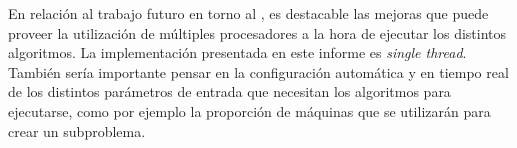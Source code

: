 \documentclass[../informe2.tex]{subfiles}
\begin{document}
\noindent En relación al trabajo futuro en torno al \mrp, es destacable las mejoras que puede proveer la utilización de múltiples procesadores a la hora de ejecutar los distintos algoritmos. La implementación presentada en este informe es \textit{single thread}. También sería importante pensar en la configuración automática y en tiempo real de los distintos parámetros de entrada que necesitan los algoritmos para ejecutarse, como por ejemplo la proporción de máquinas que se utilizarán para crear un subproblema.
\end{document}
